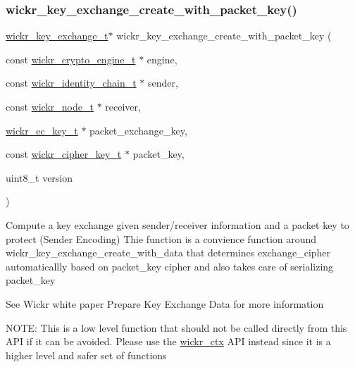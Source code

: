 \subsubsection{\texorpdfstring{wickr\+\_\+key\+\_\+exchange\+\_\+create\+\_\+with\+\_\+packet\+\_\+key()}{wickr\_key\_exchange\_create\_with\_packet\_key()}}
{\footnotesize\ttfamily \hyperlink{structwickr__key__exchange}{wickr\+\_\+key\+\_\+exchange\+\_\+t}$\ast$ wickr\+\_\+key\+\_\+exchange\+\_\+create\+\_\+with\+\_\+packet\+\_\+key (\begin{DoxyParamCaption}\item[{const \hyperlink{structwickr__crypto__engine}{wickr\+\_\+crypto\+\_\+engine\+\_\+t} $\ast$}]{engine,  }\item[{const \hyperlink{structwickr__identity__chain}{wickr\+\_\+identity\+\_\+chain\+\_\+t} $\ast$}]{sender,  }\item[{const \hyperlink{structwickr__node}{wickr\+\_\+node\+\_\+t} $\ast$}]{receiver,  }\item[{\hyperlink{structwickr__ec__key}{wickr\+\_\+ec\+\_\+key\+\_\+t} $\ast$}]{packet\+\_\+exchange\+\_\+key,  }\item[{const \hyperlink{structwickr__cipher__key}{wickr\+\_\+cipher\+\_\+key\+\_\+t} $\ast$}]{packet\+\_\+key,  }\item[{uint8\+\_\+t}]{version }\end{DoxyParamCaption})}

Compute a key exchange given sender/receiver information and a packet key to protect (Sender Encoding) Thie function is a convience function around \textquotesingle{}wickr\+\_\+key\+\_\+exchange\+\_\+create\+\_\+with\+\_\+data\textquotesingle{} that determines exchange\+\_\+cipher automaticallly based on \textquotesingle{}packet\+\_\+key\textquotesingle{} cipher and also takes care of serializing \textquotesingle{}packet\+\_\+key\textquotesingle{}

See Wickr white paper \textquotesingle{}Prepare Key Exchange Data\textquotesingle{} for more information

N\+O\+TE\+: This is a low level function that should not be called directly from this A\+PI if it can be avoided. Please use the \textquotesingle{}\hyperlink{structwickr__ctx}{wickr\+\_\+ctx}\textquotesingle{} A\+PI instead since it is a higher level and safer set of functions


